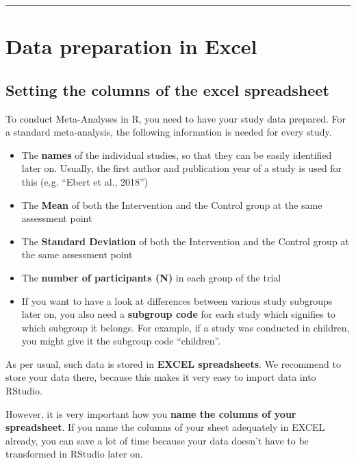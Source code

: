 \documentclass[]{book}
\providecommand{\tightlist}{%
  \setlength{\itemsep}{0pt}\setlength{\parskip}{0pt}}
\theoremstyle{definition}
\theoremstyle{definition}
\theoremstyle{definition}
\theoremstyle{remark}
\begin{document}
\begin{center}\rule{0.5\linewidth}{\linethickness}\end{center}

\section{Data preparation in Excel}\label{data-preparation-in-excel}

\hypertarget{excel_preparation}{\subsection{Setting the columns of the
excel spreadsheet}\label{excel_preparation}}

To conduct Meta-Analyses in R, you need to have your study data
prepared. For a standard meta-analysis, the following information is
needed for every study.

\begin{itemize}
\tightlist
\item
  The \textbf{names} of the individual studies, so that they can be
  easily identified later on. Usually, the first author and publication
  year of a study is used for this (e.g. ``Ebert et al., 2018'')
\item
  The \textbf{Mean} of both the Intervention and the Control group at
  the same assessment point
\item
  The \textbf{Standard Deviation} of both the Intervention and the
  Control group at the same assessment point
\item
  The \textbf{number of participants (N)} in each group of the trial
\item
  If you want to have a look at differences between various study
  subgroups later on, you also need a \textbf{subgroup code} for each
  study which signifies to which subgroup it belongs. For example, if a
  study was conducted in children, you might give it the subgroup code
  ``children''.
\end{itemize}

As per usual, such data is stored in \textbf{EXCEL spreadsheets}. We
recommend to store your data there, because this makes it very easy to
import data into RStudio.

However, it is very important how you \textbf{name the columns of your
spreadsheet}. If you name the columns of your sheet adequately in EXCEL
already, you can save a lot of time because your data doesn't have to be
transformed in RStudio later on.
\end{document}
